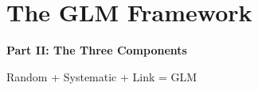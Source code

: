 \documentclass[aspectratio=169]{beamer}
\begin{document}
\section{The GLM Framework}

\begin{frame}
\begin{center}
  \vspace{1.5cm}
  {\Huge\bfseries\textcolor{popblue}{Part II: The Three Components}}

  \vspace{0.8cm}
  {\large Random + Systematic + Link = GLM}
\end{center}
\end{frame}
\end{document}
